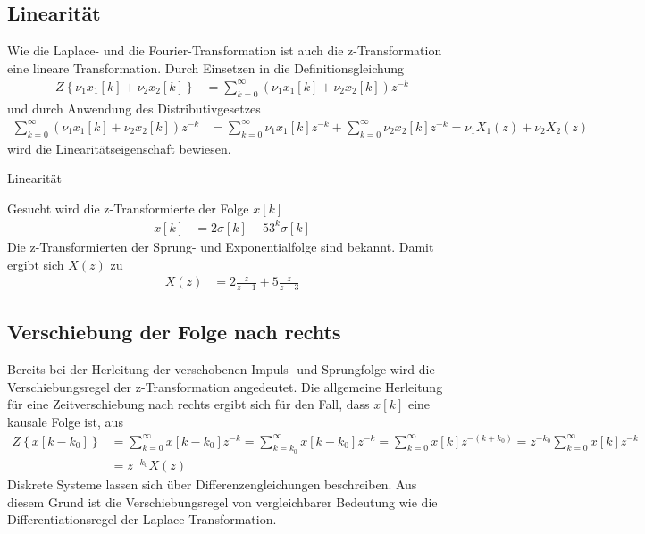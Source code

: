 \subsection{Linearität}\label{sec:linearituxe4t-2}

Wie die Laplace- und die Fourier-Transformation ist auch die z-Transformation eine lineare Transformation. Durch Einsetzen in die Definitionsgleichung
\begin{align}
Z\left\{ \nu_{1}  x_{1}[ k] + \nu_{2}  x_{2}[ k] \right\} &= \sum\limits_{k = 0}^{\infty}{\left( \nu_{1}  x_{1}[ k] + \nu_{2}  x_{2}[ k] \right)  z^{- k}} \label{eq:5.37}
\end{align}
und durch Anwendung des Distributivgesetzes
\begin{align}
\sum\limits_{k = 0}^{\infty}{\left( \nu_{1}  x_{1}[ k] + \nu_{2}  x_{2}[ k] \right)  z^{- k}} &= \sum\limits_{k = 0}^{\infty}{\nu_{1}  x_{1}[ k]  z^{- k}} + \sum\limits_{k = 0}^{\infty}{\nu_{2}  x_{2}[ k]  z^{- k}} = \nu_{1}  X_{1}(z) + \nu_{2}  X_{2}(z) \label{eq:5.38}
\end{align}
wird die Linearitätseigenschaft bewiesen.

\begin{example}{Linearität}
\label{example:beispiel-linearituxe4t}

Gesucht wird die z-Transformierte der Folge \(x[k]\)
\begin{align*}
x[ k] &= 2  \sigma[ k] + 5  3^{k}  \sigma[ k] 
\end{align*}
Die z-Transformierten der Sprung- und Exponentialfolge sind bekannt. Damit ergibt sich \(X(z)\) zu
\begin{align*}
X(z) &= 2  \frac{z}{z - 1} + 5  \frac{z}{z - 3} 
\end{align*}
\end{example}

\subsection{Verschiebung der Folge nach rechts}\label{sec:verschiebung-der-folge-nach-rechts}

Bereits bei der Herleitung der verschobenen Impuls- und Sprungfolge wird die Verschiebungsregel der z-Transformation angedeutet. Die allgemeine Herleitung für eine Zeitverschiebung nach rechts ergibt sich für den Fall, dass \(x[k]\) eine kausale Folge ist, aus
\begin{align}
{\boldsymbol{\mathit{Z}}\left\{x\left[k-k_{0} \right]\right\}} &=  {\sum\limits _{k=0}^{\infty }x\left[k-k_{0} \right] z^{-k}  =\sum\limits _{k=k_{0} }^{\infty }x\left[k-k_{0} \right] z^{-k}  =\sum\limits _{k=0}^{\infty }x[k] z^{-(k+k_{0} )}  =z^{-k_{0} }  \sum\limits _{k=0}^{\infty }x[k] z^{-k}  } \\
{} &=  {z^{-k_{0} }  X(z)}
\label{eq:5.41}
\end{align}
Diskrete Systeme lassen sich über Differenzengleichungen beschreiben. Aus diesem Grund ist die Verschiebungsregel von vergleichbarer Bedeutung wie die Differentiationsregel der Laplace-Transformation.

